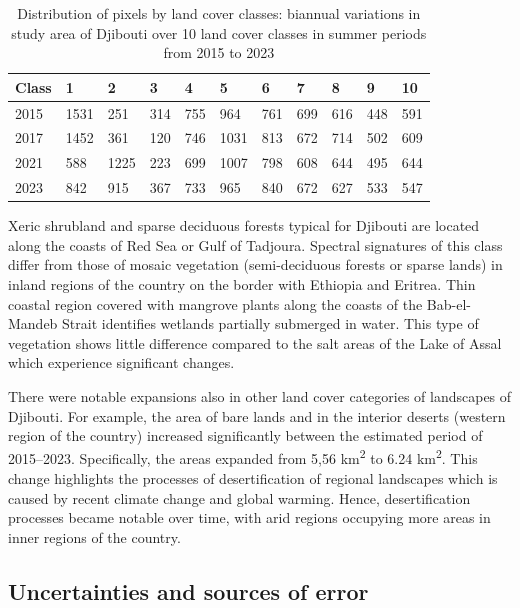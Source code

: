 \documentclass[jimaging,article,submit,pdftex,moreauthors]{Definitions/mdpi}
\begin{document}
\begin{table}[H]
\centering
\begin{tabularx}{\textwidth}{| p{1.5cm} | X | X | X | X | X | X | X | X | X | X | }
  \toprule
   Class & 1 & 2 & 3 & 4 & 5 & 6 & 7 & 8 & 9 & 10 \\
   \midrule
    2015 & 1531 & 251 & 314 & 755 & 964 & 761 & 699 & 616 & 448 & 591 \\
    2017 & 1452 & 361 & 120 & 746 & 1031 & 813 & 672 & 714 & 502 & 609 \\
    2021 & 588 & 1225 & 223 & 699 & 1007 & 798 & 608 & 644 & 495 & 644 \\
    2023 & 842 & 915 & 367 & 733 & 965 & 840 & 672 & 627 & 533 & 547 \\
    \bottomrule
\end{tabularx}
\caption{Distribution of pixels by land cover classes: biannual variations in study area of Djibouti over 10 land cover classes in summer periods from 2015 to 2023}\label{tab04}
\end{table}

Xeric shrubland and sparse deciduous forests typical for Djibouti {are} located along the coasts of Red Sea or Gulf of Tadjoura. {Spectral} signatures {of this class} differ from those of mosaic vegetation (semi-deciduous forests or sparse lands) in inland regions of the country on the border with Ethiopia and Eritrea. {Thin} coastal region covered with mangrove plants along the coasts of the Bab-el-Mandeb Strait {identifies} wetlands partially submerged in water. This {type} of vegetation shows {little} difference compared to the salt areas of the Lake of Assal which experience significant changes. 

{There were notable expansions also in other land cover categories of landscapes of Djibouti.  For example, the area of bare lands and in the interior deserts (western region of the country) increased significantly between the estimated period of 2015--2023. Specifically, the areas expanded from 5,56 km\textsuperscript{2} to 6.24 km\textsuperscript{2}. This change highlights the processes of desertification of regional landscapes which is caused by recent climate change and global warming. Hence, desertification processes became notable over time, with arid regions occupying more areas in inner regions of the country.}

\subsection{Uncertainties and sources of error}
\end{document}
